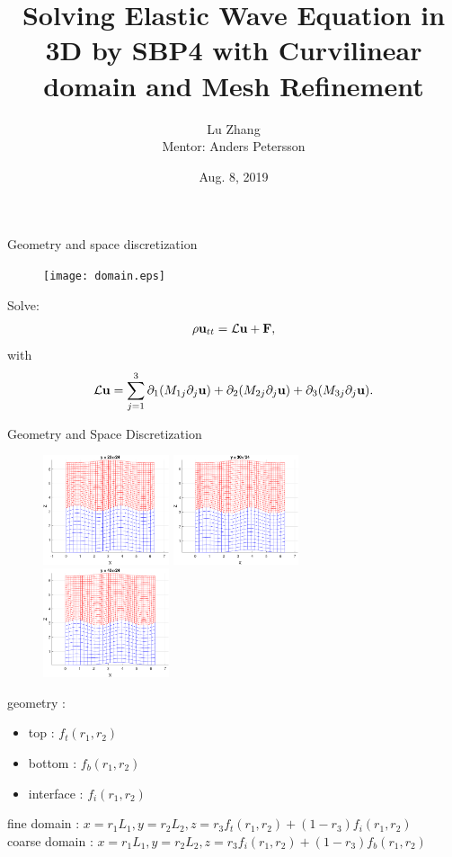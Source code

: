 \documentclass{beamer}
\title{Solving Elastic Wave Equation in 3D by SBP4 with Curvilinear domain and Mesh Refinement}
\author[Lu Zhang]{Lu Zhang\\
Mentor: Anders Petersson }
\institute[LLNL] %
{
  CASC Division\\
  Lawrence Livermore National Lab
  }
\date{Aug. 8, 2019}
\begin{document}
\begin{frame}
  \titlepage
\end{frame}

\begin{frame}{Geometry and space discretization}
 \begin{figure}[h]
\begin{center}
\texttt{[image: domain.eps]}
 \label{fig:convergence_1d}
\end{center}
\end{figure}
Solve:
\[\rho {\bf u}_{tt} = \mathcal{L} {\bf u} + {\bf F},\]
with
\[\mathcal{L} {\bf u} = \sum_{j=1}^3\partial_1(M_{1j}\partial_j{\bf u}) +\partial_2(M_{2j}\partial_j{\bf u})+\partial_3(M_{3j}\partial_j{\bf u}).\]

\end{frame}


\begin{frame}{Geometry and Space Discretization}
 \begin{figure}[h]
\begin{center}
\includegraphics[width=0.33\textwidth]{y11.eps}
\includegraphics[width=0.33\textwidth]{y16.eps}
\includegraphics[width=0.33\textwidth]{y21.eps}
\end{center}
\end{figure}  
geometry :
\begin{itemize}
    \item top : $f_t(r_1,r_2)$ 
    \item bottom : $f_b(r_1,r_2)$ 
    \item interface : $f_i(r_1,r_2)$
\end{itemize}
fine domain : $x = r_1L_1, y = r_2L_2, z = r_3f_t(r_1,r_2)+(1-r_3)f_i(r_1,r_2)$\\
coarse domain : $x = r_1L_1, y = r_2L_2, z = r_3f_i(r_1,r_2)+(1-r_3)f_b(r_1,r_2)$

\end{frame}
\end{document}
